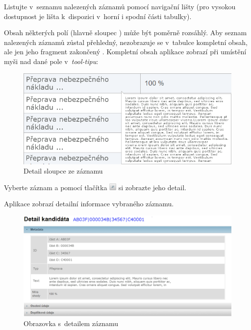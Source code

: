 \documentclass[thesis=M,czech]{FITthesis}[2019/12/23]
\begin{document}
Listujte v~seznamu nalezených záznamů pomocí navigační lišty (pro vysokou dostupnost je lišta k~dispozici v~horní i spodní části tabulky).

Obsah některých polí (hlavně sloupec ) může být poměrně rozsáhlý. Aby seznam nalezených záznamů zůstal přehledný, nezobrazuje se v~tabulce kompletní obsah, ale jen jeho fragment zakončený \uv{\ldots}. Kompletní obsah aplikace zobrazí při umístění myši nad dané pole v~\textit{tool-tipu}:
\begin{figure}[H]
  \centering
  \includegraphics[scale=1.25]{res/guide/ResponseDataAction.png}
  \caption{Detail sloupce  ze záznamu}
  \label{fig:Detail sloupce Akce ze záznamu}
\end{figure}

Vyberte záznam a pomocí tlačítka \includegraphics[height=1em]{res/guide/SearchIcon.png} si zobrazte jeho detail.

Aplikace zobrazí detailní informace vybraného záznamu.

\begin{figure}[H]
  \centering
  \includegraphics[width=\textwidth]{res/guide/ResponseDataDetail.png}
  \caption{Obrazovka s~detailem záznamu}
  \label{fig:Obrazovka s~detailem záznamu}
\end{figure}
\end{document}
